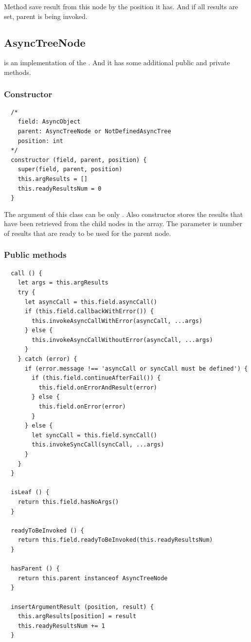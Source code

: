 \documentclass{article}
\begin{document}
Method  save result from this node by the position it has. And if all results are set, parent is being invoked.

\vspace*{10px}

\subsection{AsyncTreeNode}

 is an implementation of the . And it has some additional public and private methods.

\subsubsection{Constructor}

\begin{verbatim}
  /*
    field: AsyncObject
    parent: AsyncTreeNode or NotDefinedAsyncTree
    position: int
  */
  constructor (field, parent, position) {
    super(field, parent, position)
    this.argResults = []
    this.readyResultsNum = 0
  }
\end{verbatim}

The argument  of this class can be only . Also constructor stores the results that have been retrieved from the child nodes in the  array. The parameter  is number of results that are ready to be used for the parent node.

\newpage
\subsubsection{Public methods}

\begin{verbatim}
  call () {
    let args = this.argResults
    try {
      let asyncCall = this.field.asyncCall()
      if (this.field.callbackWithError()) {
        this.invokeAsyncCallWithError(asyncCall, ...args)
      } else {
        this.invokeAsyncCallWithoutError(asyncCall, ...args)
      }
    } catch (error) {
      if (error.message !== 'asyncCall or syncCall must be defined') {
        if (this.field.continueAfterFail()) {
          this.field.onErrorAndResult(error)
        } else {
          this.field.onError(error)
        }
      } else {
        let syncCall = this.field.syncCall()
        this.invokeSyncCall(syncCall, ...args)
      }
    }
  }

  isLeaf () {
    return this.field.hasNoArgs()
  }

  readyToBeInvoked () {
    return this.field.readyToBeInvoked(this.readyResultsNum)
  }

  hasParent () {
    return this.parent instanceof AsyncTreeNode
  }

  insertArgumentResult (position, result) {
    this.argResults[position] = result
    this.readyResultsNum += 1
  }
\end{verbatim}
\end{document}
